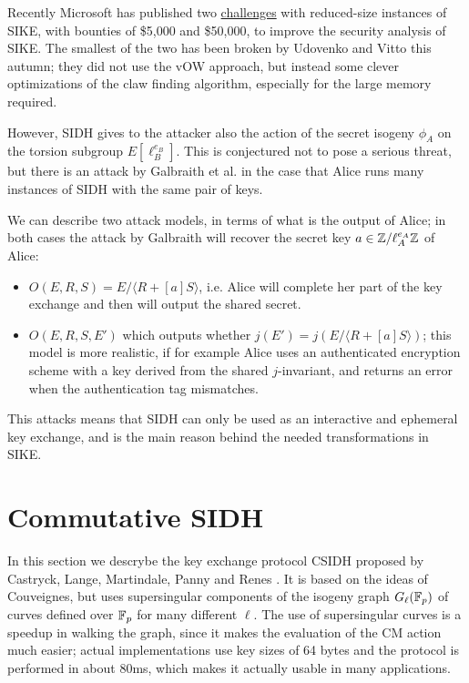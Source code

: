 Recently Microsoft has published two \href{https://www.microsoft.com/en-us/msrc/sike-cryptographic-challenge}{challenges} with reduced-size instances of SIKE, with bounties of \$5,000 and \$50,000, to improve the security analysis of SIKE. The smallest of the two has been broken by Udovenko and Vitto \cite{SIKE_challenge} this autumn; they did not use the vOW approach, but instead some clever optimizations of the claw finding algorithm, especially for the large memory required.


However, SIDH gives to the attacker also the action of the secret isogeny $\phi_A$ on the torsion subgroup $E[\ell_B^{e_B}]$. This is conjectured not to pose a serious threat, but there is an attack by Galbraith et al. \cite{Galbraith_SIKE} in the case that Alice runs many instances of SIDH with the same pair of keys.

We can describe two attack models, in terms of what is the output of Alice; in both cases the attack by Galbraith will recover the secret key $a\in\mathbb{Z}/\ell_A^{e_A}\mathbb{Z}$ of Alice:
\begin{itemize}
    \item $O(E,R,S)=E/\langle R+[a]S\rangle$, i.e. Alice will complete her part of the key exchange and then will output the shared secret.
    \item $O(E,R,S,E')$ which outputs whether $j(E')=j(E/\langle R+[a]S\rangle)$; this model is more realistic, if for example Alice uses an authenticated encryption scheme with a key derived from the shared $j$-invariant, and returns an error when the authentication tag mismatches.
\end{itemize}

This attacks means that SIDH can only be used as an interactive and ephemeral key exchange, and is the main reason behind the needed transformations in SIKE.

\section{Commutative SIDH}
In this section we descrybe the key exchange protocol CSIDH proposed by Castryck, Lange, Martindale, Panny and Renes \cite{CSIDH}. It is based on the ideas of Couveignes, but uses supersingular components of the isogeny graph $G_\ell(\mathbb{F}_p)$ of curves defined over $\mathbb{F}_p$ for many different $\ell$. The use of supersingular curves is a speedup in walking the graph, since it makes the evaluation of the CM action much easier; actual implementations use key sizes of 64 bytes and the protocol is performed in about 80ms, which makes it actually usable in many applications.

